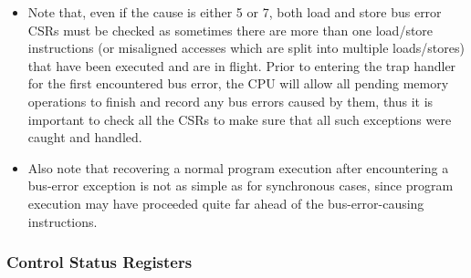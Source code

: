 \documentclass[main\_\_EN.tex]{subfiles}
\begin{document}
\begin{itemize}
\begin{itemize}
         \item Note that, even if the cause is either 5 or 7, both load and store bus error CSRs must be checked as sometimes there are more than one load/store instructions (or misaligned accesses which are split into multiple loads/stores) that have been executed and are in flight. Prior to entering the trap handler for the first encountered bus error, the CPU will allow all pending memory operations to finish and record any bus errors caused by them, thus it is important to check all the CSRs to make sure that all such exceptions were caught and handled.\\
         \item Also note that recovering a normal program execution after encountering a bus-error exception is not as simple as for synchronous cases, since program execution may have proceeded quite far ahead of the bus-error-causing instructions.
    \end{itemize}
\end{itemize}

\subsubsection{Control Status Registers}
\label{sec:riscvcpu-buserr-csr}
\end{document}
